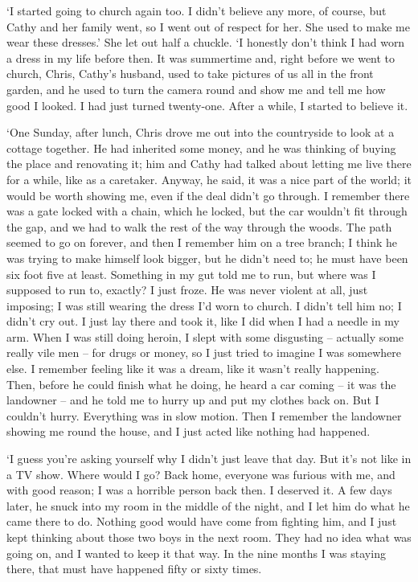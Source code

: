 `I started going to church again too. I didn't believe any more, of course, but Cathy and her family went, so I went out of respect for her. She used to make me wear these dresses.' She let out half a chuckle. `I honestly don't think I had worn a dress in my life before then. It was summertime and, right before we went to church, Chris, Cathy's husband, used to take pictures of us all in the front garden, and he used to turn the camera round and show me and tell me how good I looked. I had just turned twenty-one. After a while, I started to believe it.

`One Sunday, after lunch, Chris drove me out into the countryside to look at a cottage together. He had inherited some money, and he was thinking of buying the place and renovating it; him and Cathy had talked about letting me live there for a while, like as a caretaker. Anyway, he said, it was a nice part of the world; it would be worth showing me, even if the deal didn't go through. I remember there was a gate locked with a chain, which he locked, but the car wouldn't fit through the gap, and we had to walk the rest of the way through the woods. The path seemed to go on forever, and then I remember him on a tree branch; I think he was trying to make himself look bigger, but he didn't need to; he must have been six foot five at least. Something in my gut told me to run, but where was I supposed to run to, exactly? I just froze. He was never violent at all, just imposing; I was still wearing the dress I'd worn to church. I didn't tell him no; I didn't cry out. I just lay there and took it, like I did when I had a needle in my arm. When I was still doing heroin, I slept with some disgusting -- actually some really vile men -- for drugs or money, so I just tried to imagine I was somewhere else. I remember feeling like it was a dream, like it wasn't really happening. Then, before he could finish what he doing, he heard a car coming -- it was the landowner -- and he told me to hurry up and put my clothes back on. But I couldn't hurry. Everything was in slow motion. Then I remember the landowner showing me round the house, and I just acted like nothing had happened.

`I guess you're asking yourself why I didn't just leave that day. But it's not like in a TV show. Where would I go? Back home, everyone was furious with me, and with good reason; I was a horrible person back then. I deserved it. A few days later, he snuck into my room in the middle of the night, and I let him do what he came there to do. Nothing good would have come from fighting him, and I just kept thinking about those two boys in the next room. They had no idea what was going on, and I wanted to keep it that way. In the nine months I was staying there, that must have happened fifty or sixty times.

